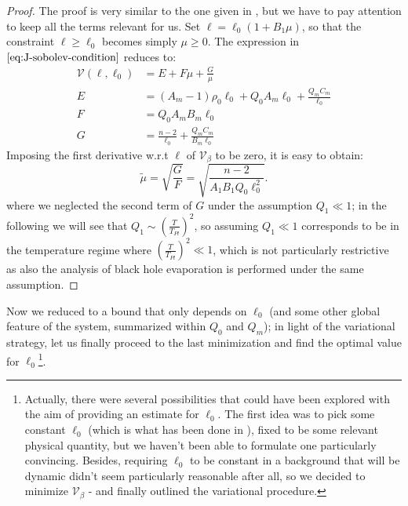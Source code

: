 \begin{proof}
    The proof is very similar to the one given in \cite{fewster2020new}, but we have to pay attention to keep all the terms relevant for us.
	\noindent
    Set \(\ell = \ell_0\left(1 + B_1\mu\right)\), so that the constraint \(\ell\ge\ell_0\) becomes simply \(\mu \ge 0\).
	The expression in \(\eqref{eq:J-sobolev-condition}\) reduces to:
    \begin{align*}
        \mathcal{V}(\ell, \ell_0) &= E + F\mu + \frac{G}{\mu} \\
        E &= (A_m - 1)\rho_0\ell_0 + Q_0A_m\ell_0 + \frac{Q_mC_m}{\ell_0}\\
        F &= Q_0A_mB_m\ell_0 \\
        G &= \frac{n- 2}{\ell_0} + \frac{Q_mC_m}{B_m\ell_0}
    \end{align*}
    Imposing the first derivative w.r.t \(\ell\) of \(\mathcal{V}_{\beta}\) to be zero, it is easy to obtain:
    \[
    \tilde{\mu} = \sqrt{\frac{G}{F}} =  \sqrt{\frac{n - 2}{A_1B_1Q_0\ell_0^2}}.
    \]
	where we neglected the second term of \(G\) under the assumption \(Q_1 \ll 1\); in the following we will see that \(Q_1 \sim \left(\frac{T}{T_{Pl}}\right)^2\), so assuming \(Q_1 \ll 1\) corresponds to be in the temperature regime where \(\left(\frac{T}{T_{Pl}}\right)^2 \ll 1\), which is not particularly restrictive as also the analysis of black hole evaporation is performed under the same assumption.
\end{proof}

Now we reduced to a bound that only depends on \(\ell_0\) (and some other global feature of the system, summarized within \(Q_0\) and \(Q_m\)); in light of the variational strategy, let us finally proceed to the last minimization and find the optimal value for \(\ell_0\)\footnote{Actually, there were several possibilities that could have been explored with the aim of providing an estimate for \(\ell_0\). The first idea was to pick some constant \(\ell_0\) (which is what has been done in \cite{fewster2020new}), fixed to be some relevant physical quantity, but we haven't been able to formulate one particularly convincing. Besides, requiring \(\ell_0\) to be constant in a background that will be dynamic didn't seem particularly reasonable after all, so we decided to minimize \(\mathcal{V}_{\beta}\) - and finally outlined the variational procedure.}. 

